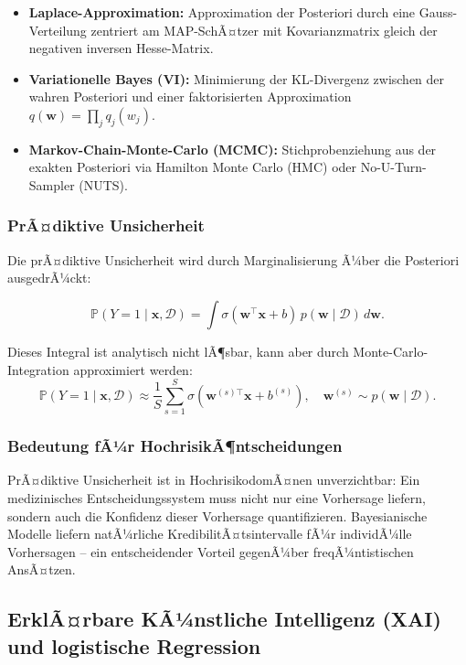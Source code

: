 ﻿\documentclass[12pt, a4paper]{article}
\theoremstyle{definition}
\theoremstyle{remark}
\newcommand{\Prob}{\mathbb{P}}
\newcommand{\sigmoid}{\sigma}
\newcommand{\vw}{\bm{w}}
\newcommand{\vx}{\bm{x}}
\newcommand{\T}{\top}
\begin{document}
\begin{itemize}
  \item \textbf{Laplace-Approximation:} Approximation der Posteriori durch eine Gauss-Vertei\-lung
    zentriert am MAP-SchÃ¤tzer mit Kovarianzmatrix gleich der negativen inversen Hesse-Matrix.
  \item \textbf{Variationelle Bayes (VI):} Minimierung der KL-Divergenz zwischen der
    wahren Posteriori und einer faktorisierten Approximation $q(\vw) = \prod_j q_j(w_j)$.
  \item \textbf{Markov-Chain-Monte-Carlo (MCMC):} Stichprobenziehung aus der exakten Posteriori
    via Hamilton Monte Carlo (HMC) oder No-U-Turn-Sampler (NUTS).
\end{itemize}

\subsubsection{PrÃ¤diktive Unsicherheit}

Die prÃ¤diktive Unsicherheit wird durch Marginalisierung Ã¼ber die Posteriori ausgedrÃ¼ckt:

\begin{equation}
  \Prob(Y=1 \mid \vx, \mathcal{D}) = \int \sigmoid(\vw^\T\vx+b)\, p(\vw\mid\mathcal{D})\, d\vw.
  \label{eq:pred_uncertainty}
\end{equation}

Dieses Integral ist analytisch nicht lÃ¶sbar, kann aber durch Monte-Carlo-Integration
approximiert werden:
\[
  \Prob(Y=1 \mid \vx, \mathcal{D}) \approx \frac{1}{S}\sum_{s=1}^S \sigmoid(\vw^{(s)\T}\vx+b^{(s)}),
  \quad \vw^{(s)} \sim p(\vw\mid\mathcal{D}).
\]

\subsubsection{Bedeutung fÃ¼r HochrisikÃ¶ntscheidungen}

PrÃ¤diktive Unsicherheit ist in HochrisikodomÃ¤nen unverzichtbar: Ein medizinisches
Entscheidungssystem muss nicht nur eine Vorhersage liefern, sondern auch die Konfidenz dieser
Vorhersage quantifizieren. Bayesianische Modelle liefern natÃ¼rliche KredibilitÃ¤tsintervalle
fÃ¼r individÃ¼lle Vorhersagen -- ein entscheidender Vorteil gegenÃ¼ber freqÃ¼ntistischen AnsÃ¤tzen.

\subsection{ErklÃ¤rbare KÃ¼nstliche Intelligenz (XAI) und logistische Regression}
\end{document}
